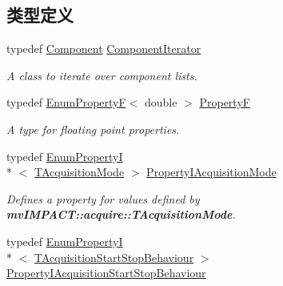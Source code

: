 \subsection*{类型定义}
\begin{DoxyCompactItemize}
\item 
typedef \hyperlink{classmv_i_m_p_a_c_t_1_1acquire_1_1_component}{Component} \hyperlink{group___common_interface_ga461a5ba2197d9e599ee35e2514d684ef}{Component\+Iterator}
\begin{DoxyCompactList}\small\item\em A class to iterate over component lists. \end{DoxyCompactList}\item 
typedef \hyperlink{classmv_i_m_p_a_c_t_1_1acquire_1_1_enum_property_f}{Enum\+Property\+F}$<$ double $>$ \hyperlink{group___common_interface_gaf54865fe5a3d5cfd15f9a111b40d09f9}{Property\+F}
\begin{DoxyCompactList}\small\item\em A type for floating point properties. \end{DoxyCompactList}\item 
\hypertarget{group___common_interface_gadfe0e124b4ab278eb8bb228d3c4ba63b}{typedef \hyperlink{classmv_i_m_p_a_c_t_1_1acquire_1_1_enum_property_i}{Enum\+Property\+I}\\*
$<$ \hyperlink{group___common_interface_ga712e943ac923bb84ce2f83a57b20e6b1}{T\+Acquisition\+Mode} $>$ \hyperlink{group___common_interface_gadfe0e124b4ab278eb8bb228d3c4ba63b}{Property\+I\+Acquisition\+Mode}}\label{group___common_interface_gadfe0e124b4ab278eb8bb228d3c4ba63b}

\begin{DoxyCompactList}\small\item\em Defines a property for values defined by {\bfseries mv\+I\+M\+P\+A\+C\+T\+::acquire\+::\+T\+Acquisition\+Mode}. \end{DoxyCompactList}\item 
\hypertarget{group___common_interface_ga4b53c0f0c5478e5c079b4c2082c53690}{typedef \hyperlink{classmv_i_m_p_a_c_t_1_1acquire_1_1_enum_property_i}{Enum\+Property\+I}\\*
$<$ \hyperlink{group___common_interface_ga5c60e3239df59a2d82b529ebc7ed13f5}{T\+Acquisition\+Start\+Stop\+Behaviour} $>$ \hyperlink{group___common_interface_ga4b53c0f0c5478e5c079b4c2082c53690}{Property\+I\+Acquisition\+Start\+Stop\+Behaviour}}\label{group___common_interface_ga4b53c0f0c5478e5c079b4c2082c53690}


\end{DoxyCompactItemize}
